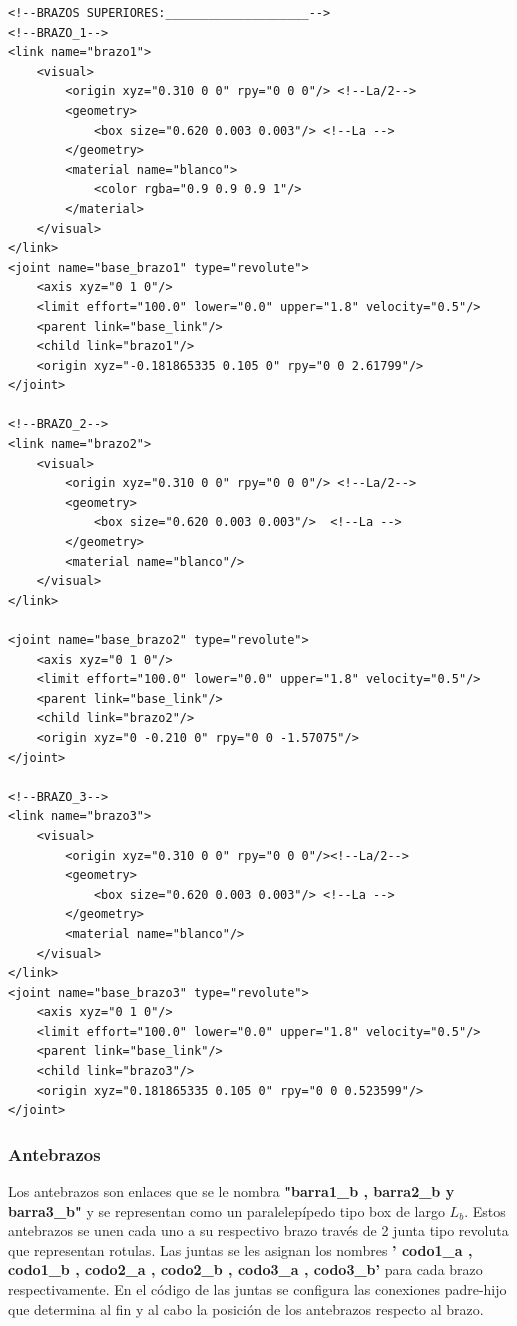         \lstset{language=XML}
        \begin{lstlisting}
<!--BRAZOS SUPERIORES:____________________-->
<!--BRAZO_1-->
<link name="brazo1">
	<visual>
		<origin xyz="0.310 0 0" rpy="0 0 0"/> <!--La/2-->
		<geometry>
			<box size="0.620 0.003 0.003"/> <!--La -->
		</geometry>
		<material name="blanco">
			<color rgba="0.9 0.9 0.9 1"/>
		</material>
	</visual>
</link>
<joint name="base_brazo1" type="revolute">
	<axis xyz="0 1 0"/>
	<limit effort="100.0" lower="0.0" upper="1.8" velocity="0.5"/>
	<parent link="base_link"/>
	<child link="brazo1"/>
	<origin xyz="-0.181865335 0.105 0" rpy="0 0 2.61799"/> 
</joint>

<!--BRAZO_2-->
<link name="brazo2">
	<visual>
		<origin xyz="0.310 0 0" rpy="0 0 0"/> <!--La/2-->
		<geometry>
			<box size="0.620 0.003 0.003"/>  <!--La -->
		</geometry>
		<material name="blanco"/>
	</visual>
</link>

<joint name="base_brazo2" type="revolute">
	<axis xyz="0 1 0"/>
	<limit effort="100.0" lower="0.0" upper="1.8" velocity="0.5"/>
	<parent link="base_link"/>
	<child link="brazo2"/>
	<origin xyz="0 -0.210 0" rpy="0 0 -1.57075"/> 
</joint>

<!--BRAZO_3-->
<link name="brazo3">
	<visual>
		<origin xyz="0.310 0 0" rpy="0 0 0"/><!--La/2-->
		<geometry>
			<box size="0.620 0.003 0.003"/> <!--La -->
		</geometry>
		<material name="blanco"/>
	</visual>
</link>
<joint name="base_brazo3" type="revolute">
	<axis xyz="0 1 0"/>
	<limit effort="100.0" lower="0.0" upper="1.8" velocity="0.5"/>
	<parent link="base_link"/>
	<child link="brazo3"/>
	<origin xyz="0.181865335 0.105 0" rpy="0 0 0.523599"/> 
</joint>
        \end{lstlisting}
        
        \newpage

       
       \subsubsection{Antebrazos}
       
        Los antebrazos son enlaces que se le nombra \textbf{"barra1\_b , barra2\_b y barra3\_b"} y se representan como un paralelepípedo tipo box de largo \textbf{$L_b$}. Estos antebrazos se unen cada uno a su respectivo brazo través de 2 junta tipo revoluta que representan rotulas. Las juntas se les asignan los nombres \textbf{' codo1\_a , codo1\_b , codo2\_a , codo2\_b , codo3\_a , codo3\_b'} para cada brazo respectivamente. En el código de las juntas se configura las conexiones padre-hijo que determina al fin y al cabo la posición de los antebrazos respecto al brazo.
        
